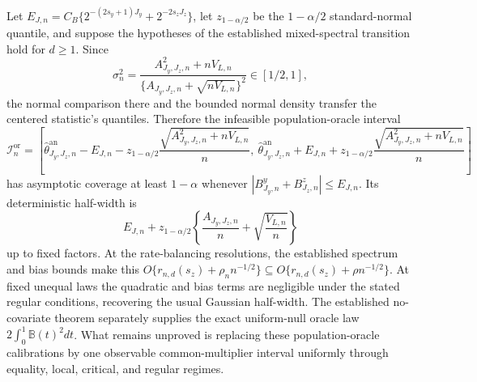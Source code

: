 Let \(E_{J,n}=C_B\{2^{-(2s_y+1)J_y}+2^{-2s_zJ_z}\}\), let \(z_{1-\alpha/2}\) be the \(1-\alpha/2\) standard-normal quantile, and suppose the hypotheses of the established mixed-spectral transition hold for \(d\ge1\). Since \[\sigma_n^2=\frac{A_{J_y,J_z,n}^2+nV_{L,n}}{\{A_{J_y,J_z,n}+\sqrt{nV_{L,n}}\}^2}\in[1/2,1],\] the normal comparison there and the bounded normal density transfer the centered statistic's quantiles. Therefore the infeasible population-oracle interval \[\mathcal I_n^{\mathrm{or}}=\left[\widehat\theta^{\mathrm{an}}_{J_y,J_z,n}-E_{J,n}-z_{1-\alpha/2}\frac{\sqrt{A_{J_y,J_z,n}^2+nV_{L,n}}}{n},\ \widehat\theta^{\mathrm{an}}_{J_y,J_z,n}+E_{J,n}+z_{1-\alpha/2}\frac{\sqrt{A_{J_y,J_z,n}^2+nV_{L,n}}}{n}\right]\] has asymptotic coverage at least \(1-\alpha\) whenever \(|B^y_{J_y,n}+B^z_{J_z,n}|\le E_{J,n}\). Its deterministic half-width is \[E_{J,n}+z_{1-\alpha/2}\left\{\frac{A_{J_y,J_z,n}}{n}+\sqrt{\frac{V_{L,n}}{n}}\right\}\] up to fixed factors. At the rate-balancing resolutions, the established spectrum and bias bounds make this \(O\{r_{n,d}(s_z)+\rho_n n^{-1/2}\}\subseteq O\{r_{n,d}(s_z)+\rho n^{-1/2}\}\). At fixed unequal laws the quadratic and bias terms are negligible under the stated regular conditions, recovering the usual Gaussian half-width. The established no-covariate theorem separately supplies the exact uniform-null oracle law \(2\int_0^1\mathbb B(t)^2dt\). What remains unproved is replacing these population-oracle calibrations by one observable common-multiplier interval uniformly through equality, local, critical, and regular regimes.